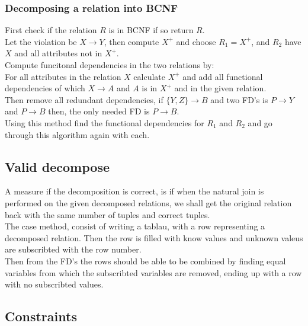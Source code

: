 \documentclass[12pt, a4paper]{article}
\begin{document}
			\subsubsection{Decomposing a relation into BCNF}
				First check if the relation $R$ is in BCNF if so return $R$.\\[4mm]
				Let the violation be $X\rightarrow Y$, then compute $X^+$ and choose $R_1=X^+$, and $R_2$ have $X$ and all attributes not in $X^+$.\\[4mm]
				Compute funcitonal dependencies in the two relations by:\\
				For all attributes in the relation $X$ calculate $X^+$  and add all functional dependencies of which $X\rightarrow A$ and $A$ is in $X^+$ and in the given relation.\\
				Then remove all redundant dependencies, if $\{Y,Z\}\rightarrow B$ and two FD's is $P\rightarrow Y$ and $P\rightarrow B$ then, the only needed FD is $P\rightarrow B$.\\
				Using this method find the functional dependencies for $R_1$ and $R_2$ and go through this algorithm again with each.
		\subsection{Valid decompose}
			A measure if the decomposition is correct, is if when the natural join is performed on the given decomposed relations, we shall get the original relation back with the same number of tuples and correct tuples.\\
			The case method, consist of writing a tablau, with a row representing a decomposed relation. Then the row is filled with know values and unknown valeus are subscribted with the row number.\\
			Then from the FD's the rows should be able to be combined by finding equal variables from which the subscribted variables are removed, ending up with a row with no subscribted values.
		\subsection{Constraints}
\end{document}

